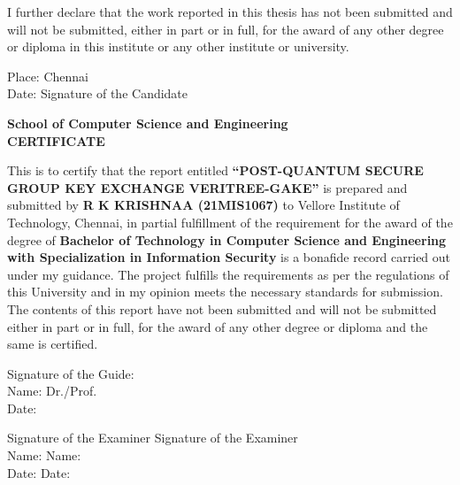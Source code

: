 \documentclass[12pt,a4paper]{report}
\begin{document}
I further declare that the work reported in this thesis has not been submitted and will not be submitted, either in part or in full, for the award of any other degree or diploma in this institute or any other institute or university.

\vspace{3cm}

\noindent Place: Chennai\\
Date: \hspace{9cm} Signature of the Candidate

\newpage
\thispagestyle{empty}

\begin{center}

{\fontsize{16}{19}\bfseries School of Computer Science and Engineering}\\[1cm]

{\fontsize{14}{17}\bfseries CERTIFICATE}
\end{center}

\vspace{1cm}

This is to certify that the report entitled \textbf{``POST-QUANTUM SECURE GROUP KEY EXCHANGE VERITREE-GAKE''} is prepared and submitted by \textbf{R K KRISHNAA (21MIS1067)} to Vellore Institute of Technology, Chennai, in partial fulfillment of the requirement for the award of the degree of \textbf{Bachelor of Technology in Computer Science and Engineering with Specialization in Information Security} is a bonafide record carried out under my guidance. The project fulfills the requirements as per the regulations of this University and in my opinion meets the necessary standards for submission. The contents of this report have not been submitted and will not be submitted either in part or in full, for the award of any other degree or diploma and the same is certified.

\vspace{2cm}

\noindent Signature of the Guide:\\
Name: Dr./Prof. \\
Date:

\vspace{2cm}

\noindent Signature of the Examiner \hspace{3cm} Signature of the Examiner\\
Name: \hspace{6.3cm} Name:\\
Date: \hspace{6.5cm} Date:
\end{document}
